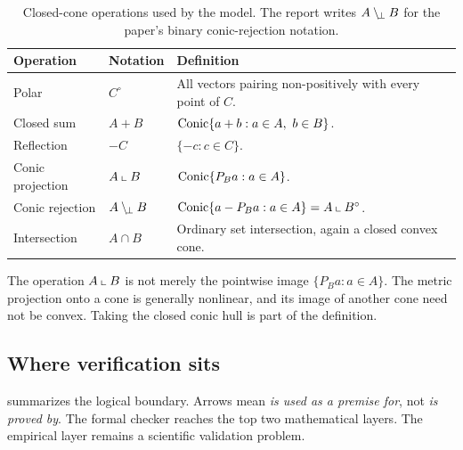 \documentclass[11pt,a4paper]{article}
\begin{document}
\begin{table}[htbp]
\centering
\caption{Closed-cone operations used by the model. The report writes
\(A\crej B\) for the paper's binary conic-rejection notation.}
\label{tab:operations}
\begin{tabularx}{\linewidth}{@{}L{26mm}L{34mm}Y@{}}
\toprule
\textbf{Operation} & \textbf{Notation} & \textbf{Definition} \\
\midrule
Polar & \(C^\circ\) &
All vectors pairing non-positively with every point of \(C\). \\
Closed sum & \(A+B\) &
\(\operatorname{Conic}\{a+b:a\in A,\ b\in B\}\). \\
Reflection & \(-C\) &
\(\{-c:c\in C\}\). \\
Conic projection & \(A\mathbin{\llcorner} B\) &
\(\operatorname{Conic}\{P_Ba:a\in A\}\). \\
Conic rejection & \(A\crej B\) &
\(\operatorname{Conic}\{a-P_Ba:a\in A\}=A\mathbin{\llcorner} B^\circ\). \\
Intersection & \(A\cap B\) &
Ordinary set intersection, again a closed convex cone. \\
\bottomrule
\end{tabularx}
\end{table}

The operation \(A\mathbin{\llcorner} B\) is not merely the pointwise image
\(\{P_Ba:a\in A\}\). The metric projection onto a cone is generally nonlinear,
and its image of another cone need not be convex. Taking the closed conic
hull is part of the definition.

\subsection{Where verification sits}

 summarizes the logical boundary. Arrows mean
\emph{is used as a premise for}, not \emph{is proved by}. The formal checker
reaches the top two mathematical layers. The empirical layer remains a
scientific validation problem.
\end{document}
